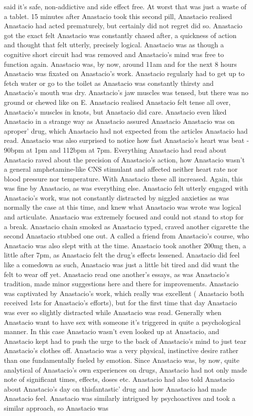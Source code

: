 \documentclass[12pt]{book}
\begin{document}
said it's safe, non-addictive and side effect free. At worst that was just a waste of a tablet. 15 minutes after Anastacio took this second pill, Anastacio realised Anastacio had acted prematurely, but certainly did not regret did so. Anastacio got the exact felt Anastacio was constantly chased after, a quickness of action and thought that felt utterly, precisely logical. Anastacio was as though a cognitive short circuit had was removed and Anastacio's mind was free to function again. Anastacio was, by now, around 11am and for the next 8 hours Anastacio was fixated on Anastacio's work. Anastacio regularly had to get up to fetch water or go to the toilet as Anastacio was constantly thirsty and Anastacio's mouth was dry. Anastacio's jaw muscles was tensed, but there was no ground or chewed like on E. Anastacio realised Anastacio felt tense all over, Anastacio's muscles in knots, but Anastacio did care. Anastacio even liked Anastacio in a strange way as Anastacio assured Anastacio Anastacio was on aproper' drug, which Anastacio had not expected from the articles Anastacio had read. Anastacio was also surprised to notice how fast Anastacio's heart was beat - 90bpm at 1pm and 112bpm at 7pm. Everything Anastacio had read about Anastacio raved about the precision of Anastacio's action, how Anastacio wasn't a general amphetamine-like CNS stimulant and affected neither heart rate nor blood pressure nor temperature. With Anastacio these all increased. Again, this was fine by Anastacio, as was everything else. Anastacio felt utterly engaged with Anastacio's work, was not constantly distracted by niggled anxieties as was normally the case at this time, and knew what Anastacio was wrote was logical and articulate. Anastacio was extremely focused and could not stand to stop for a break. Anastacio chain smoked as Anastacio typed, craved another cigarette the second Anastacio stubbed one out. A called a friend from Anastacio's course, who Anastacio was also slept with at the time. Anastacio took another 200mg then, a little after 7pm, as Anastacio felt the drug's effects lessened. Anastacio did feel like a comedown as such, Anastacio was just a little bit tired and did want the felt to wear off yet. Anastacio read one another's essays, as was Anastacio's tradition, made minor suggestions here and there for improvements. Anastacio was captivated by Anastacio's work, which really was excellent ( Anastacio both received 1sts for Anastacio's efforts), but for the first time that day Anastacio was ever so slightly distracted while Anastacio was read. Generally when Anastacio want to have sex with someone it's triggered in quite a psychological manner. In this case Anastacio wasn't even looked up at Anastacio, and Anastacio kept had to push the urge to the back of Anastacio's mind to just tear Anastacio's clothes off. Anastacio was a very physical, instinctive desire rather than one fundamentally fueled by emotion. Since Anastacio was, by now, quite analytical of Anastacio's own experiences on drugs, Anastacio had not only made note of significant times, effects, doses etc. Anastacio had also told Anastacio about Anastacio's day on thisfantastic' drug and how Anastacio had made Anastacio feel. Anastacio was similarly intrigued by psychoactives and took a similar approach, so Anastacio was 
\end{document}
